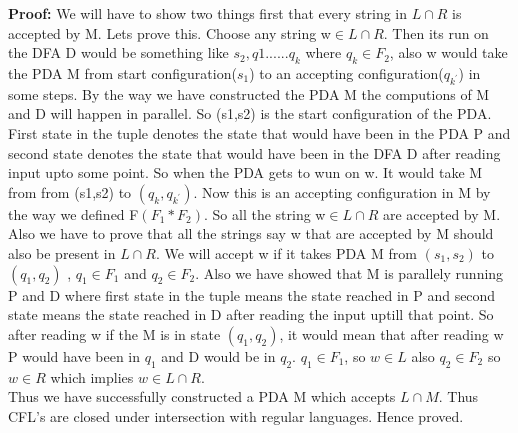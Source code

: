 \documentclass{article}
\begin{document}
\textbf{Proof:} We will have to show two things first that every string in $L\cap R$ is accepted by M. Lets prove this. Choose any string w$\in L\cap R$. Then its run on the DFA D would be something like $s_2,q1......q_k$ where $q_k \in F_2$, also w would take the PDA M from start configuration($s_1$) to an accepting configuration($q_{k^{'}}$) in some steps. By the way we have constructed the PDA M the computions of M and D will happen in parallel. So (s1,s2) is the start configuration of the PDA. First state in the tuple denotes the state that would have been in the PDA P and second state denotes the state that would have been in the DFA D after reading input upto some point. So when the PDA gets to wun on w. It would take M from from (s1,s2) to $(q_k,q_{k^{'}})$. Now this is an accepting configuration in M by the way we defined F$(F_1 * F_2)$. So all the string  w$\in L\cap R$ are accepted by M.\\
Also we have to prove that all the strings say w that are accepted by M should also be present in $ L\cap R$. We will accept w if it takes PDA M from $(s_1,s_2)$ to $(q_1,q_2)$ , $q_1 \in F_1$ and $q_2 \in F_2$. Also we have showed that M is parallely running P and D where first state in the tuple means the state reached in P and second state means the state reached in D after reading the input uptill that point. So after reading  w if the M is in state $(q_1,q_2)$, it would mean that after reading w P would have been in $q_1$ and D would be in $q_2$. $q_1 \in F_1$, so $w \in L$ also $q_2 \in F_2$ so $w \in R$ which implies $w \in L \cap R$.\\
\newline
Thus we have successfully constructed a PDA M which accepts $L \cap M$. Thus CFL's are closed under intersection with regular languages. Hence proved. \\
\pagebreak
\end{document}
